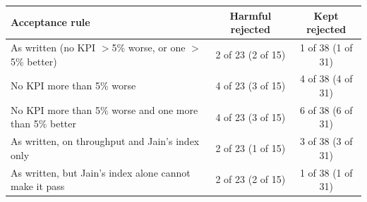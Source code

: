 \begin{tabular}{|>{\raggedright\arraybackslash}p{3.0cm}|c|c|}
\hline
Acceptance rule & Harmful rejected & Kept rejected \\
\hline
As written (no KPI $>$5\% worse, or one $>$5\% better) & 2 of 23 (2 of 15) & 1 of 38 (1 of 31) \\
\hline
No KPI more than 5\% worse & 4 of 23 (3 of 15) & 4 of 38 (4 of 31) \\
\hline
No KPI more than 5\% worse and one more than 5\% better & 4 of 23 (3 of 15) & 6 of 38 (6 of 31) \\
\hline
As written, on throughput and Jain's index only & 2 of 23 (1 of 15) & 3 of 38 (3 of 31) \\
\hline
As written, but Jain's index alone cannot make it pass & 2 of 23 (2 of 15) & 1 of 38 (1 of 31) \\
\hline
\end{tabular}

